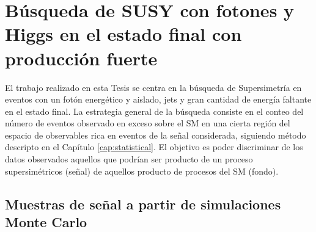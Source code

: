 \chapter{Búsqueda de SUSY con fotones y Higgs en el estado final con producción fuerte}




El trabajo realizado en esta Tesis se centra en la búsqueda de Supersimetría en eventos con un fotón energético y aislado, jets y gran cantidad de energía faltante en el estado final. La estrategia general de la búsqueda consiste en el conteo del número de eventos observado en exceso sobre el SM en una cierta región del espacio de observables rica en eventos de la señal considerada, siguiendo método descripto en el Capítulo \ref{cap:statistical}. El objetivo es poder discriminar de los datos observados aquellos que podrían ser producto de un proceso supersimétricos (señal) de aquellos producto de procesos del SM (fondo).


\section{Muestras de señal a partir de simulaciones Monte Carlo}\label{sec:signal_samples}

